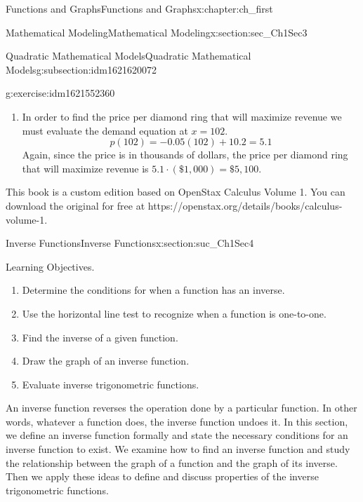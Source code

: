 \documentclass[oneside,10pt,]{book}
\numberwithin{equation}{section}
\begin{document}
\begin{chapterptx}{Functions and Graphs}{}{Functions and Graphs}{}{}{x:chapter:ch_first}
\begin{sectionptx}{Mathematical Modeling}{}{Mathematical Modeling}{}{}{x:section:sec_Ch1Sec3}
\begin{subsectionptx}{Quadratic Mathematical Models}{}{Quadratic Mathematical Models}{}{}{g:subsection:idm1621620072}
\begin{inlineexercise}{}{g:exercise:idm1621552360}
\begin{enumerate}
\item{}In order to find the price per diamond ring that will maximize revenue we must evaluate the demand equation at \(x=102\).%
\begin{equation*}
p(102)=-0.05(102)+10.2=5.1
\end{equation*}
Again, since the price is in thousands of dollars, the price per diamond ring that will maximize revenue is \(5.1\cdot(\$1,000)=\$5,100\).%
\end{enumerate}
\end{inlineexercise}%
\end{subsectionptx}
This book is a custom edition based on OpenStax Calculus Volume 1. You can download the original for free at https:\slash{}\slash{}openstax.org\slash{}details\slash{}books\slash{}calculus-volume-1.%
\end{sectionptx}
%
%
\typeout{************************************************}
\typeout{************************************************}
%
\begin{sectionptx}{Inverse Functions}{}{Inverse Functions}{}{}{x:section:suc_Ch1Sec4}
\begin{introduction}{Learning Objectives.}%
%
\begin{enumerate}
\item{}Determine the conditions for when a function has an inverse.%
\item{}Use the horizontal line test to recognize when a function is one-to-one.%
\item{}Find the inverse of a given function.%
\item{}Draw the graph of an inverse function.%
\item{}Evaluate inverse trigonometric functions.%
\end{enumerate}
An inverse function reverses the operation done by a particular function. In other words, whatever a function does, the inverse function undoes it. In this section, we define an inverse function formally and state the necessary conditions for an inverse function to exist. We examine how to find an inverse function and study the relationship between the graph of a function and the graph of its inverse. Then we apply these ideas to define and discuss properties of the inverse trigonometric functions.%
\end{introduction}%
%
%
\typeout{************************************************}
\typeout{************************************************}

\end{sectionptx}
\end{chapterptx}
\end{document}
